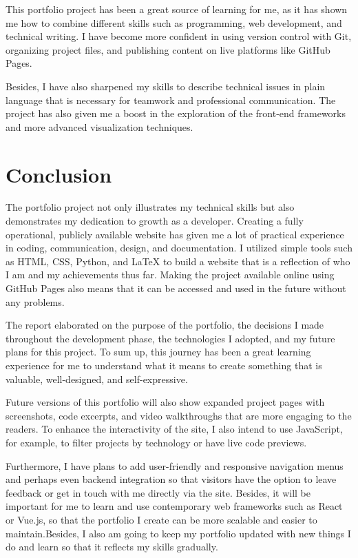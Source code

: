 \documentclass[12pt,a4paper]{article}
\begin{document}
This portfolio project has been a great source of learning for me, as it has shown me how to combine different skills such as programming, web development, and technical writing. I have become more confident in using version control with Git, organizing project files, and publishing content on live platforms like GitHub Pages.

Besides, I have also sharpened my skills to describe technical issues in plain language that is necessary for teamwork and professional communication. The project has also given me a boost in the exploration of the front-end frameworks and more advanced visualization techniques.


\section{Conclusion}
The portfolio project not only illustrates my technical skills but also demonstrates my dedication to growth as a developer. Creating a fully operational, publicly available website has given me a lot of practical experience in coding, communication, design, and documentation.
I utilized simple tools such as HTML, CSS, Python, and LaTeX to build a website that is a reflection of who I am and my achievements thus far. Making the project available online using GitHub Pages also means that it can be accessed and used in the future without any problems.

The report elaborated on the purpose of the portfolio, the decisions I made throughout the development phase, the technologies I adopted, and my future plans for this project. To sum up, this journey has been a great learning experience for me to understand what it means to create something that is valuable, well-designed, and self-expressive.

Future versions of this portfolio will also show expanded project pages with screenshots, code excerpts, and video walkthroughs that are more engaging to the readers. To enhance the interactivity of the site, I also intend to use JavaScript, for example, to filter projects by technology or have live code previews.

Furthermore, I have plans to add user-friendly and responsive navigation menus and perhaps even backend integration so that visitors have the option to leave feedback or get in touch with me directly via the site. Besides, it will be important for me to learn and use contemporary web frameworks such as React or Vue.js, so that the portfolio I create can be more scalable and easier to maintain.Besides, I also am going to keep my portfolio updated with new things I do and learn so that it reflects my skills gradually.
\end{document}
